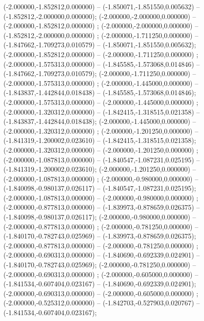  (-2.000000,-1.852812,0.000000) -- (-1.850071,-1.851550,0.005632) -- (-1.852812,-2.000000,0.000000);
 (-2.000000,-2.000000,0.000000) -- (-2.000000,-1.852812,0.000000) ;
 (-2.000000,-2.000000,0.000000) -- (-1.852812,-2.000000,0.000000) ;
 (-2.000000,-1.711250,0.000000) -- (-1.847662,-1.709273,0.010579) -- (-1.850071,-1.851550,0.005632);
 (-2.000000,-1.852812,0.000000) -- (-2.000000,-1.711250,0.000000) ;
 (-2.000000,-1.575313,0.000000) -- (-1.845585,-1.573068,0.014846) -- (-1.847662,-1.709273,0.010579);
 (-2.000000,-1.711250,0.000000) -- (-2.000000,-1.575313,0.000000) ;
 (-2.000000,-1.445000,0.000000) -- (-1.843837,-1.442844,0.018438) -- (-1.845585,-1.573068,0.014846);
 (-2.000000,-1.575313,0.000000) -- (-2.000000,-1.445000,0.000000) ;
 (-2.000000,-1.320312,0.000000) -- (-1.842415,-1.318515,0.021358) -- (-1.843837,-1.442844,0.018438);
 (-2.000000,-1.445000,0.000000) -- (-2.000000,-1.320312,0.000000) ;
 (-2.000000,-1.201250,0.000000) -- (-1.841319,-1.200002,0.023610) -- (-1.842415,-1.318515,0.021358);
 (-2.000000,-1.320312,0.000000) -- (-2.000000,-1.201250,0.000000) ;
 (-2.000000,-1.087813,0.000000) -- (-1.840547,-1.087231,0.025195) -- (-1.841319,-1.200002,0.023610);
 (-2.000000,-1.201250,0.000000) -- (-2.000000,-1.087813,0.000000) ;
 (-2.000000,-0.980000,0.000000) -- (-1.840098,-0.980137,0.026117) -- (-1.840547,-1.087231,0.025195);
 (-2.000000,-1.087813,0.000000) -- (-2.000000,-0.980000,0.000000) ;
 (-2.000000,-0.877813,0.000000) -- (-1.839973,-0.878659,0.026375) -- (-1.840098,-0.980137,0.026117);
 (-2.000000,-0.980000,0.000000) -- (-2.000000,-0.877813,0.000000) ;
 (-2.000000,-0.781250,0.000000) -- (-1.840170,-0.782743,0.025969) -- (-1.839973,-0.878659,0.026375);
 (-2.000000,-0.877813,0.000000) -- (-2.000000,-0.781250,0.000000) ;
 (-2.000000,-0.690313,0.000000) -- (-1.840690,-0.692339,0.024901) -- (-1.840170,-0.782743,0.025969);
 (-2.000000,-0.781250,0.000000) -- (-2.000000,-0.690313,0.000000) ;
 (-2.000000,-0.605000,0.000000) -- (-1.841534,-0.607404,0.023167) -- (-1.840690,-0.692339,0.024901);
 (-2.000000,-0.690313,0.000000) -- (-2.000000,-0.605000,0.000000) ;
 (-2.000000,-0.525312,0.000000) -- (-1.842703,-0.527903,0.020767) -- (-1.841534,-0.607404,0.023167);
